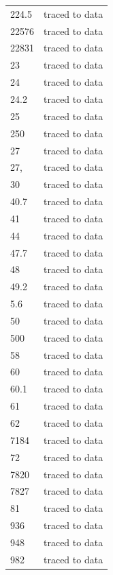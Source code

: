 \documentclass[10pt]{article}
\begin{document}
{\begin{longtable}{p{4cm}p{5cm}}
224.5 & traced to data \\
22576 & traced to data \\
22831 & traced to data \\
23 & traced to data \\
24 & traced to data \\
24.2 & traced to data \\
25 & traced to data \\
250 & traced to data \\
27 & traced to data \\
27, & traced to data \\
30 & traced to data \\
40.7 & traced to data \\
41 & traced to data \\
44 & traced to data \\
47.7 & traced to data \\
48 & traced to data \\
49.2 & traced to data \\
5.6 & traced to data \\
50 & traced to data \\
500 & traced to data \\
58 & traced to data \\
60 & traced to data \\
60.1 & traced to data \\
61 & traced to data \\
62 & traced to data \\
7184 & traced to data \\
72 & traced to data \\
7820 & traced to data \\
7827 & traced to data \\
81 & traced to data \\
936 & traced to data \\
948 & traced to data \\
982 & traced to data \\
\bottomrule\end{longtable}}
\end{document}

